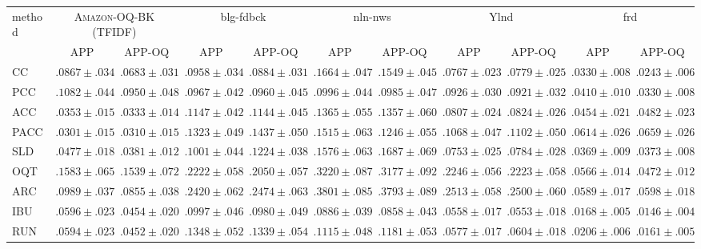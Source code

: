 \begin{tabular}{lcccccccccc}
  \toprule
  \multirow{2}{*}{method} & \multicolumn{2}{c}{\textsc{Amazon-OQ-BK} (TFIDF)} & \multicolumn{2}{c}{blg-fdbck} & \multicolumn{2}{c}{nln-nws} & \multicolumn{2}{c}{Ylnd} & \multicolumn{2}{c}{frd} \\
  & APP & APP-OQ & APP & APP-OQ & APP & APP-OQ & APP & APP-OQ & APP & APP-OQ \\
  \midrule
  CC & ${.0867 \pm .034}$ & ${.0683 \pm .031}$ & ${.0958 \pm .034}$ & ${.0884 \pm .031}$ & ${.1664 \pm .047}$ & ${.1549 \pm .045}$ & ${.0767 \pm .023}$ & ${.0779 \pm .025}$ & ${.0330 \pm .008}$ & ${.0243 \pm .006}$ \\
  PCC & ${.1082 \pm .044}$ & ${.0950 \pm .048}$ & ${.0967 \pm .042}$ & ${.0960 \pm .045}$ & ${.0996 \pm .044}$ & ${.0985 \pm .047}$ & ${.0926 \pm .030}$ & ${.0921 \pm .032}$ & ${.0410 \pm .010}$ & ${.0330 \pm .008}$ \\
  ACC & ${.0353 \pm .015}$ & ${.0333 \pm .014}$ & ${.1147 \pm .042}$ & ${.1144 \pm .045}$ & ${.1365 \pm .055}$ & ${.1357 \pm .060}$ & ${.0807 \pm .024}$ & ${.0824 \pm .026}$ & ${.0454 \pm .021}$ & ${.0482 \pm .023}$ \\
  PACC & ${.0301 \pm .015}$ & ${.0310 \pm .015}$ & ${.1323 \pm .049}$ & ${.1437 \pm .050}$ & ${.1515 \pm .063}$ & ${.1246 \pm .055}$ & ${.1068 \pm .047}$ & ${.1102 \pm .050}$ & ${.0614 \pm .026}$ & ${.0659 \pm .026}$ \\
  SLD & ${.0477 \pm .018}$ & ${.0381 \pm .012}$ & ${.1001 \pm .044}$ & ${.1224 \pm .038}$ & ${.1576 \pm .063}$ & ${.1687 \pm .069}$ & ${.0753 \pm .025}$ & ${.0784 \pm .028}$ & ${.0369 \pm .009}$ & ${.0373 \pm .008}$ \\[.5em]
  OQT & ${.1583 \pm .065}$ & ${.1539 \pm .072}$ & ${.2222 \pm .058}$ & ${.2050 \pm .057}$ & ${.3220 \pm .087}$ & ${.3177 \pm .092}$ & ${.2246 \pm .056}$ & ${.2223 \pm .058}$ & ${.0566 \pm .014}$ & ${.0472 \pm .012}$ \\
  ARC & ${.0989 \pm .037}$ & ${.0855 \pm .038}$ & ${.2420 \pm .062}$ & ${.2474 \pm .063}$ & ${.3801 \pm .085}$ & ${.3793 \pm .089}$ & ${.2513 \pm .058}$ & ${.2500 \pm .060}$ & ${.0589 \pm .017}$ & ${.0598 \pm .018}$ \\
  IBU & ${.0596 \pm .023}$ & ${.0454 \pm .020}$ & ${.0997 \pm .046}$ & ${.0980 \pm .049}$ & ${.0886 \pm .039}$ & ${.0858 \pm .043}$ & $\mathbf{.0558 \pm .017}$ & ${.0553 \pm .018}$ & $\mathbf{.0168 \pm .005}$ & $\mathbf{.0146 \pm .004}$ \\
  RUN & ${.0594 \pm .023}$ & ${.0452 \pm .020}$ & ${.1348 \pm .052}$ & ${.1339 \pm .054}$ & ${.1115 \pm .048}$ & ${.1181 \pm .053}$ & ${.0577 \pm .017}$ & ${.0604 \pm .018}$ & ${.0206 \pm .006}$ & ${.0161 \pm .005}$ \\[.5em]

\end{tabular}
